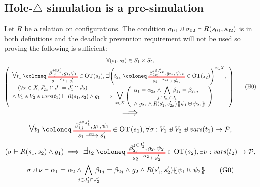 \documentclass{article}
\begin{document}
\subsection{Hole-\(\triangle\) simulation is a pre-simulation}\label{apx:presim}
Let \(R\) be a relation on configurations.
The condition \(\sigma_{01} \uplus \sigma_{02} \vdash R{\left(s_{01}, s_{02}\right)}\) is in both definitions and the deadlock prevention requirement will not be used so proving the following is sufficient:
\begin{multline}
	\forall \mpar{s_1, s_2} \in S_1 \times S_2, \\
	\mpar{\everymath{\displaystyle}\begin{array}{l}
		\bigsymb{\forall} t_1 \defobject \OTx{1}{}{1}{1} \in \fOT{s_1}, \bigsymb{\exists} \mpar{t_{2x} \defobject \OTx{2}{x}{2x}{2x} \in \fOT{s_2}}^{x \in X}, \\
		\quad \mpar{\forall x \in X, J'_{2x} \cap J_1 = J'_1 \cap J_2} \\[-10pt]
		\nwedge V_1 \uplus V_2 \uplus \fvars{t_1} \vdash R\mpar{s_1, s_2} \wedge g_1 \implies \operatorname*{\bigsymb{\bigvee}}_{x \in X} \mpar{\begin{array}{l}
			\alpha_1 = \alpha_{2x} \wedge \bigwedge_\subbox{j \in J'_{2x} \cap J_1} \beta_{1j} = \beta_{2xj} \\[12pt]
			\nwedge g_{2x} \wedge R\mpar{s'_1, s'_{2x}}\psubst{\psi_1 \uplus \psi_{2x}}
		\end{array}}
	\end{array}} \hyp{0}
\end{multline}
\[ \text{\Large\(\displaystyle \implies\)} \]\vspace{-1cm}
\begin{multline}
	\bigsymb{\forall} t_1 \defobject \OTx{1}{}{1}{1} \in \fOT{s_1}, \forall \sigma: V_1 \uplus V_2 \uplus \fvars{t_1} \to \values, \\
	\mpar{\sigma \vdash R\mpar{s_1, s_2} \wedge g_1} \implies \bigsymb{\exists} t_2 \defobject \OTx{2}{}{2}{2} \in \fOT{s_2}, \exists \nu: \fvars{t_2} \to \values, \\
	\sigma \uplus \nu \vdash \alpha_1 = \alpha_2 \wedge \bigwedge_\subbox{j \in J'_1 \cap J'_2} \beta_{1j} = \beta_{2j} \wedge g_2 \wedge R\mpar{s'_1, s'_2}\psubst{\psi_1 \uplus \psi_2} \goal{0}
\end{multline}
\end{document}
